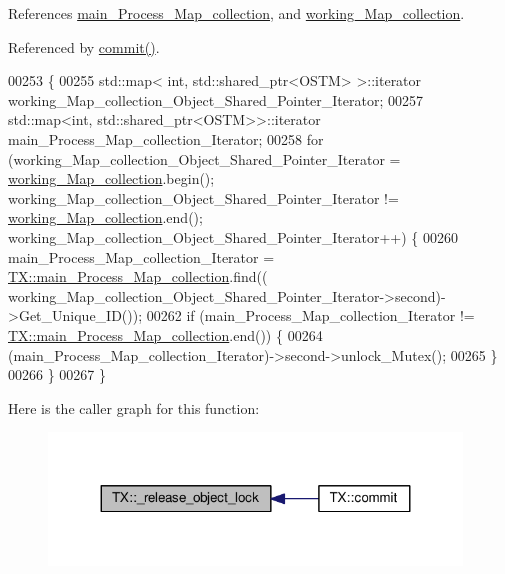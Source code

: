 References \hyperlink{_t_x_8h_source_l00105}{main\+\_\+\+Process\+\_\+\+Map\+\_\+collection}, and \hyperlink{_t_x_8h_source_l00093}{working\+\_\+\+Map\+\_\+collection}.



Referenced by \hyperlink{_t_x_8cpp_source_l00177}{commit()}.


\begin{DoxyCode}
00253                              \{
00255     std::map< int, std::shared\_ptr<OSTM> >::iterator working\_Map\_collection\_Object\_Shared\_Pointer\_Iterator;
00257     std::map<int, std::shared\_ptr<OSTM>>::iterator main\_Process\_Map\_collection\_Iterator;
00258     \textcolor{keywordflow}{for} (working\_Map\_collection\_Object\_Shared\_Pointer\_Iterator = 
      \hyperlink{class_t_x_a81aafda16e2f20e36ec6c68e584668ff_a81aafda16e2f20e36ec6c68e584668ff}{working\_Map\_collection}.begin(); working\_Map\_collection\_Object\_Shared\_Pointer\_Iterator
       != \hyperlink{class_t_x_a81aafda16e2f20e36ec6c68e584668ff_a81aafda16e2f20e36ec6c68e584668ff}{working\_Map\_collection}.end(); 
      working\_Map\_collection\_Object\_Shared\_Pointer\_Iterator++) \{
00260             main\_Process\_Map\_collection\_Iterator = 
      \hyperlink{class_t_x_a1a45d726894190695314464d7cd97c29_a1a45d726894190695314464d7cd97c29}{TX::main\_Process\_Map\_collection}.find((
      working\_Map\_collection\_Object\_Shared\_Pointer\_Iterator->second)->Get\_Unique\_ID());
00262             \textcolor{keywordflow}{if} (main\_Process\_Map\_collection\_Iterator != 
      \hyperlink{class_t_x_a1a45d726894190695314464d7cd97c29_a1a45d726894190695314464d7cd97c29}{TX::main\_Process\_Map\_collection}.end()) \{
00264                 (main\_Process\_Map\_collection\_Iterator)->second->unlock\_Mutex();
00265             \} 
00266         \}
00267 \}
\end{DoxyCode}


Here is the caller graph for this function\+:
\nopagebreak
\begin{figure}[H]
\begin{center}
\leavevmode
\includegraphics[width=311pt]{class_t_x_a4c13d2015dc15d0f788fa9a1413f0463_a4c13d2015dc15d0f788fa9a1413f0463_icgraph}
\end{center}
\end{figure}


